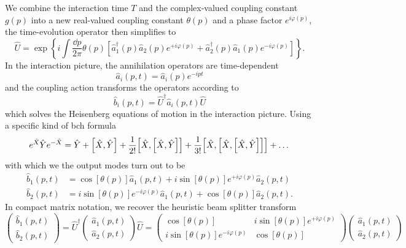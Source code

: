 We combine the interaction time $T$ and the complex-valued coupling   constant $g(p)$ into a new real-valued coupling constant $\theta(p)$ and a phase factor $e^{i\varphi(p)}$, the time-evolution operator then simplifies to
\begin{equation}
	\hat{U}
	=
	\exp\left\{
		i
		\int\frac{\dd{p}}{2\pi}
		\theta(p)
		\left[
			\hat{a}_1^\dagger(p)
			\hat{a}_2(p)
			e^{+i\varphi(p)}
			+
			\hat{a}_2^\dagger(p)
			\hat{a}_1(p)
			e^{-i\varphi(p)}
		\right]
	\right\}
	.
\end{equation}
In the interaction picture, the annihilation operators are time-dependent
\begin{equation}
	\hat{a}_i(p,t)
	=
	\hat{a}_i(p)e^{-ipt}
\end{equation}
and the coupling action transforms the operators according to
\begin{equation}
	\hat{b}_i(p,t)
	=
	\hat{U}^\dagger
	\hat{a}_i(p,t)
	\hat{U}
\end{equation}
which solves the Heisenberg equations of motion in the interaction picture.
Using a specific kind of \gls{bch} formula
\begin{equation}
	e^{\hat{X}}
	\hat{Y}
	e^{-\hat{X}}
	=
	\hat{Y}
	+
	\comm{\hat{X}}{\hat{Y}}
	+
	\frac{1}{2!}
	\comm{\hat{X}}{\comm{\hat{X}}{\hat{Y}}}
	+
	\frac{1}{3!}
	\comm{\hat{X}}{\comm{\hat{X}}{\comm{\hat{X}}{\hat{Y}}}}
	+
	\dots
\end{equation}
with which we the output modes turn out to be
\begin{align}
	\hat{b}_1(p,t)
	&=
	\cos[\theta(p)]
	\hat{a}_1(p,t)
	+
	i\sin[\theta(p)]
	e^{+i\varphi(p)}
	\hat{a}_2(p,t)
	\\
	\hat{b}_2(p,t)
	&=
	i\sin[\theta(p)]
	e^{-i\varphi(p)}
	\hat{a}_1(p,t)
	+
	\cos[\theta(p)]
	\hat{a}_2(p,t)
	.
\end{align}
In compact matrix notation, we recover the heuristic beam splitter transform
\begin{equation}
	\begin{pmatrix}
		\hat{b}_1(p,t)
		\\
		\hat{b}_2(p,t)
	\end{pmatrix}
	=
	\hat{U}^\dagger
	\begin{pmatrix}
		\hat{a}_1(p,t)
		\\
		\hat{a}_2(p,t)
	\end{pmatrix}
	\hat{U}
	=
	\begin{pmatrix}
		\cos[\theta(p)] & i\sin[\theta(p)]e^{+i\varphi(p)}
		\\
		i\sin[\theta(p)]e^{-i\varphi(p)} & \cos[\theta(p)]
	\end{pmatrix}
	\begin{pmatrix}
		\hat{a}_1(p,t)
		\\
		\hat{a}_2(p,t)
	\end{pmatrix}
\end{equation}
